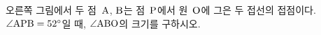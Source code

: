\noindent\begin{minipage}[t]{0.58\linewidth}\vspace{0pt}\raggedright 오른쪽 그림에서 두 점~$\mathrm{A}$, $\mathrm{B}$는 점~$\mathrm{P}$에서 원~$\mathrm{O}$에 그은 두 접선의 접점이다. $\angle\mathrm{APB}=52^\circ$일 때, $\angle\mathrm{ABO}$의 크기를 구하시오.\end{minipage}\hfill\begin{minipage}[t]{0.4\linewidth}\vspace{0pt}\centering \resizebox{\ifdim\width>\linewidth\linewidth\else\width\fi}{!}{}\end{minipage}\par
